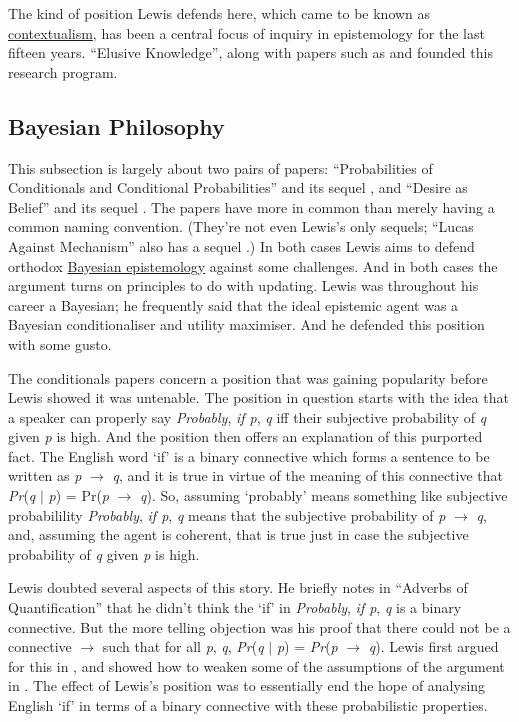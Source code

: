 The kind of position Lewis defends here, which came to be known as \href{http://plato.stanford.edu/contextualism-epistemology/}{contextualism}, has been a central focus of inquiry in epistemology for the last fifteen years. ``Elusive Knowledge'', along with papers such as \citet{Cohen1986} and \citet{DeRose1995} founded this research program.

\subsection{Bayesian Philosophy} 
This subsection is largely about two pairs of papers: ``Probabilities of Conditionals and Conditional Probabilities'' \citeyearpar{Lewis1976b} and its sequel \citeyearpar{Lewis1986h}, and ``Desire as Belief'' \citeyearpar{Lewis1988b} and its sequel \citeyearpar{Lewis1996a}. The papers have more in common than merely having a common naming convention. (They're not even Lewis's only sequels; ``Lucas Against Mechanism'' \citeyearpar{Lewis1969b} also has a sequel \citeyearpar{Lewis1979d}.) In both cases Lewis aims to defend orthodox \href{http://plato.stanford.edu/epistemology-bayesian/}{Bayesian epistemology} against some challenges. And in both cases the argument turns on principles to do with updating. Lewis was throughout his career a Bayesian; he frequently said that the ideal epistemic agent was a Bayesian conditionaliser and utility maximiser. And he defended this position with some gusto.

The conditionals papers concern a position that was gaining popularity before Lewis showed it was untenable. The position in question starts with the idea that a speaker can properly say \textit{Probably}, \textit{if p}, \textit{q} iff their subjective probability of \textit{q} given \textit{p} is high. And the position then offers an explanation of this purported fact. The English word `if' is a binary connective which forms a sentence to be written as \textit{p} \(\rightarrow\) \textit{q}, and it is true in virtue of the meaning of this connective that \textit{Pr}(\textit{q} \(|\) \textit{p}) = Pr(\textit{p} \(\rightarrow\) \textit{q}). So, assuming `probably' means something like subjective probabilility \textit{Probably}, \textit{if p}, \textit{q} means that the subjective probability of \textit{p} \(\rightarrow\) \textit{q}, and, assuming the agent is coherent, that is true just in case the subjective probability of \textit{q} given \textit{p} is high.

Lewis doubted several aspects of this story. He briefly notes in ``Adverbs of Quantification'' that he didn't think the `if' in \textit{Probably}, \textit{if p}, \textit{q} is a binary connective. But the more telling objection was his proof that there could not be a connective \(\rightarrow\) such that for all \textit{p}, \textit{q}, \textit{Pr}(\textit{q} \(|\) \textit{p}) = \textit{Pr}(\textit{p} \(\rightarrow\) \textit{q}). Lewis first argued for this in \citeyearpar{Lewis1976b}, and showed how to weaken some of the assumptions of the argument in \citeyearpar{Lewis1986h}. The effect of Lewis's position was to essentially end the hope of analysing English `if' in terms of a binary connective with these probabilistic properties.

